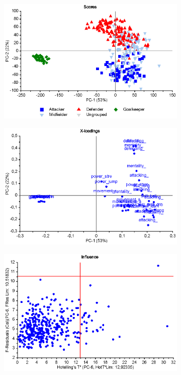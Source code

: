 \begin{figure}[h]
 	\centering
 	\begin{subfigure}[t]{0.48\textwidth}
 		\centering
 		\includegraphics[width=\textwidth]{figurer/fifa-pca1-scores}
 		\caption{}
 		\label{}
 	\end{subfigure}	
 	\begin{subfigure}[t]{0.48\textwidth}
 		\centering
 		\includegraphics[width=\textwidth]{figurer/fifa-pca1-loadings}
 		\caption{}
 		\label{}
 	\end{subfigure}
 	\begin{subfigure}[t]{0.48\textwidth}
 		\centering
 		\includegraphics[width=\textwidth]{figurer/fifa-pca1-influence}

\end{subfigure}
\end{figure}

